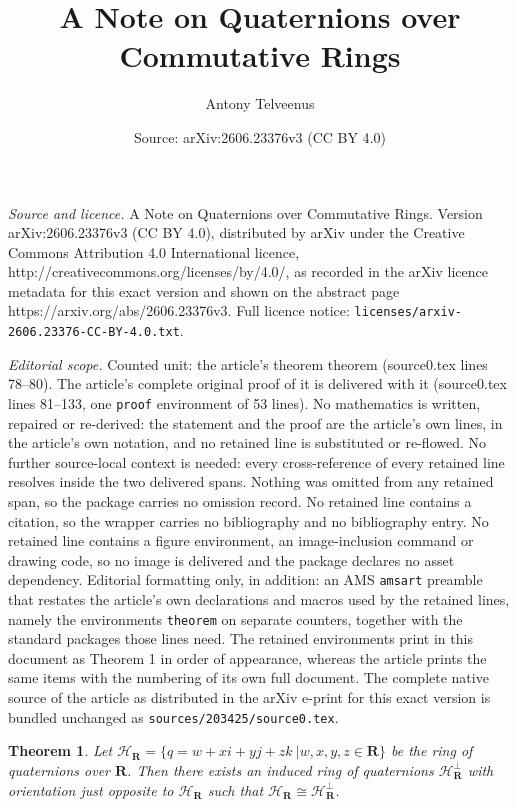 \documentclass[10pt,a4paper]{amsart}
\title{A Note on Quaternions over Commutative Rings}
\author{Antony Telveenus}
\date{Source: arXiv:2606.23376v3 (CC BY 4.0)}
\newtheorem{theorem}{Theorem}
\begin{document}
\maketitle

\noindent\emph{Source and licence.} A Note on Quaternions over Commutative Rings. Version arXiv:2606.23376v3 (CC BY 4.0), distributed by arXiv under the Creative Commons Attribution 4.0 International licence, http://creativecommons.org/licenses/by/4.0/, as recorded in the arXiv licence metadata for this exact version and shown on the abstract page https://arxiv.org/abs/2606.23376v3. Full licence notice: \texttt{licenses/arxiv-2606.23376-CC-BY-4.0.txt}.\par\smallskip

\noindent\textit{Editorial scope.} Counted unit: the article's theorem theorem (source0.tex lines 78--80). The article's complete original proof of it is delivered with it (source0.tex lines 81--133, one \texttt{proof} environment of 53 lines). No mathematics is written, repaired or re-derived: the statement and the proof are the article's own lines, in the article's own notation, and no retained line is substituted or re-flowed.  No further source-local context is needed: every cross-reference of every retained line resolves inside the two delivered spans.  Nothing was omitted from any retained span, so the package carries no omission record.  No retained line contains a citation, so the wrapper carries no bibliography and no bibliography entry.  No retained line contains a figure environment, an image-inclusion command or drawing code, so no image is delivered and the package declares no asset dependency.  Editorial formatting only, in addition: an AMS \texttt{amsart} preamble that restates the article's own declarations and macros used by the retained lines, namely the environments \texttt{theorem} on separate counters, together with the standard packages those lines need.  The retained environments print in this document as Theorem 1 in order of appearance, whereas the article prints the same items with the numbering of its own full document.  The complete native source of the article as distributed in the arXiv e-print for this exact version is bundled unchanged as \texttt{sources/203425/source0.tex}.
\begin{theorem}
Let $\mathcal{H_{\mathbf{R}}}=\{ q=w+xi+yj+zk \ | w,x,y,z\in \mathbf{R}\}$ be the ring of quaternions over $\mathbf{R}$. Then there exists an induced ring of quaternions $\mathcal{H_{\mathbf{R}}^{\perp}}$ with orientation just opposite to $\mathcal{H_{\mathbf{R}}}$ such that $\mathcal{H}_{\mathbf{R}}\cong\mathcal{H_{\mathbf{R}}^{\perp}}$. 
\end{theorem}
\end{document}
